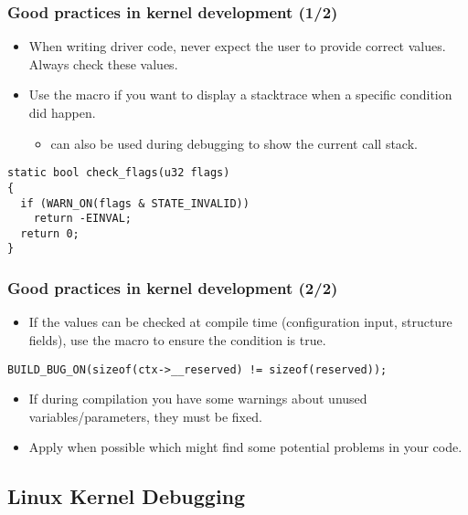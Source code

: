 \begin{frame}[fragile]
  \frametitle{Good practices in kernel development (1/2)}
  \begin{itemize}
    \item When writing driver code, never expect the user to provide correct
          values. Always check these values.
    \item Use the  macro if you want to display a stacktrace when
      a specific condition did happen.
    \begin{itemize}
      \item {} can also be used during debugging to
        show the current call stack.
    \end{itemize}
  \end{itemize}
  \begin{block}{}
    \begin{verbatim}
static bool check_flags(u32 flags)
{
  if (WARN_ON(flags & STATE_INVALID))
    return -EINVAL;
  return 0;
}
    \end{verbatim}
  \end{block}
\end{frame}

\begin{frame}[fragile]
  \frametitle{Good practices in kernel development (2/2)}
  \begin{itemize}
    \item If the values can be checked at compile time (configuration input,
           structure fields), use the  macro to
          ensure the condition is true.
  \end{itemize}
  \begin{block}{}
    \begin{verbatim}
BUILD_BUG_ON(sizeof(ctx->__reserved) != sizeof(reserved));
    \end{verbatim}
  \end{block}
  \begin{itemize}
    \item If during compilation you have some warnings about unused
          variables/parameters, they must be fixed.
    \item Apply  when possible which might find some
          potential problems in your code.
  \end{itemize}
\end{frame}

\subsection{Linux Kernel Debugging}

